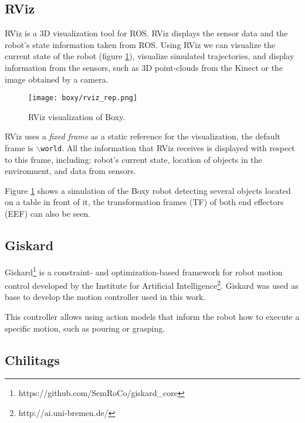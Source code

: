\subsection{RViz}
\label{subsec:rviz}

RViz is a 3D visualization tool for ROS. RViz displays the sensor data and the robot's state information taken from ROS. Using RViz we can visualize the current state of the robot (figure \ref{fig:rviz}), visualize simulated trajectories, and display information from the sensors, such as 3D point-clouds from the Kinect or the image obtained by a camera.

\begin{figure}[H]
	\centering
	\texttt{[image: boxy/rviz\_rep.png]}
	\vspace{-10pt}
	\caption{RViz visualization of Boxy.}
	\vspace{-15pt}
	\label{fig:rviz}
\end{figure}

RViz uses a \textit{fixed frame} as a static reference for the visualization, the default frame is  \texttt{$\backslash$world}. All the information that RViz receives is displayed with respect to this frame, including: robot's current state, location of objects in the environment, and data from sensors.

Figure \ref{fig:rviz} shows a simulation of the Boxy robot detecting several objects located on a table in front of it, the transformation frames (TF) of both end effectors (EEF) can also be seen.

\subsection{Giskard}
\label{subsec:giskard}
Giskard\footnote{https://github.com/SemRoCo/giskard\_core} is a constraint- and optimization-based framework for robot motion control developed by the Institute for Artificial Intelligence\footnote{http://ai.uni-bremen.de/}. Giskard was used as base to develop the motion controller used in this work.

This controller allows using action models that inform the robot how to execute a specific motion, such as pouring or grasping.

\subsection{Chilitags}

